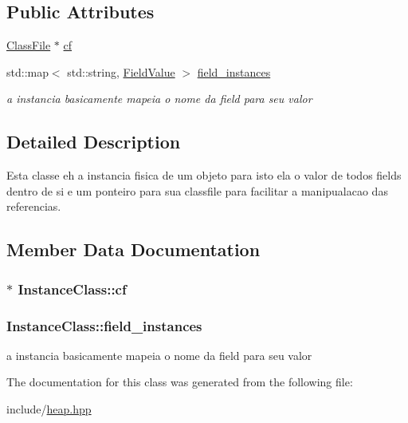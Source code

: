 \subsection*{Public Attributes}
\begin{DoxyCompactItemize}
\item 
\hyperlink{classClassFile}{Class\+File} $\ast$ \hyperlink{classInstanceClass_aeb9db24db45ec79011ef631aa8d75cf4}{cf}
\item 
std\+::map$<$ std\+::string, \hyperlink{classFieldValue}{Field\+Value} $>$ \hyperlink{classInstanceClass_a54a27ef099353666a92d3d8a6e0d65d3}{field\+\_\+instances}
\begin{DoxyCompactList}\small\item\em a instancia basicamente mapeia o nome da field para seu valor \end{DoxyCompactList}\end{DoxyCompactItemize}


\subsection{Detailed Description}
Esta classe eh a instancia fisica de um objeto para isto ela o valor de todos fields dentro de si e um ponteiro para sua classfile para facilitar a manipualacao das referencias. 

\subsection{Member Data Documentation}
\hypertarget{classInstanceClass_aeb9db24db45ec79011ef631aa8d75cf4}{
\subsubsection[{cf}]{$\ast$ Instance\+Class\+::cf}}\label{classInstanceClass_aeb9db24db45ec79011ef631aa8d75cf4}
\hypertarget{classInstanceClass_a54a27ef099353666a92d3d8a6e0d65d3}{
\subsubsection[{field\+\_\+instances}]{\setlength{\rightskip}{0pt plus 5cm}Instance\+Class\+::field\+\_\+instances}}\label{classInstanceClass_a54a27ef099353666a92d3d8a6e0d65d3}


a instancia basicamente mapeia o nome da field para seu valor 



The documentation for this class was generated from the following file\+:\begin{DoxyCompactItemize}
\item 
include/\hyperlink{heap_8hpp}{heap.\+hpp}\end{DoxyCompactItemize}
